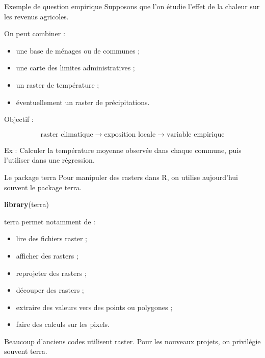 \documentclass[
  10pt,
  ignorenonframetext,
]{beamer}
\newenvironment{Shaded}{\begin{snugshade}}{\end{snugshade}}
\newcommand{\FunctionTok}[1]{\textcolor[rgb]{0.13,0.29,0.53}{\textbf{#1}}}
\newcommand{\NormalTok}[1]{#1}
\begin{document}
\begin{frame}{Exemple de question empirique}
\label{exemple-de-question-empirique-1}
Supposons que l'on étudie l'effet de la chaleur sur les revenus
agricoles.

On peut combiner :

\begin{itemize}
  \item une base de ménages ou de communes ;
  \item une carte des limites administratives ;
  \item un raster de température ;
  \item éventuellement un raster de précipitations.
\end{itemize}

Objectif :

\[
\text{raster climatique}
\rightarrow
\text{exposition locale}
\rightarrow
\text{variable empirique}
\]

Ex : Calculer la température moyenne observée dans chaque commune, puis
l'utiliser dans une régression.
\end{frame}

\begin{frame}[fragile]{Le package terra}
\label{le-package-terra}
Pour manipuler des rasters dans R, on utilise aujourd'hui souvent le
package terra.

\begin{Shaded}
\begin{Highlighting}[]
\FunctionTok{library}\NormalTok{(terra)}
\end{Highlighting}
\end{Shaded}

terra permet notamment de :

\begin{itemize}
\item lire des fichiers raster ;
\item afficher des rasters ;
\item reprojeter des rasters ;
\item découper des rasters ;
\item extraire des valeurs vers des points ou polygones ;
\item faire des calculs sur les pixels.
\end{itemize}

Beaucoup d'anciens codes utilisent raster. Pour les nouveaux projets, on
privilégie souvent terra.
\end{frame}
\end{document}
